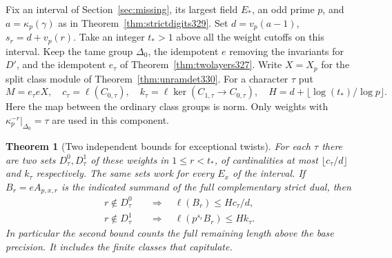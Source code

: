 \documentclass[a4paper,11pt]{article}
\newtheorem{theorem}[proposition]{Theorem}
\theoremstyle{definition}
\theoremstyle{remark}
\numberwithin{equation}{section}
\begin{document}
Fix an interval of Section~\ref{sec:missing}, its largest field $E_*$,
an odd prime $p$, and $a=\kappa_p(\gamma)$ as in
Theorem~\ref{thm:strictdigits329}. Set $d=v_p(a-1)$, $s_r=d+v_p(r)$.
Take an integer $t_*>1$ above all the weight cutoffs on this interval.
Keep the tame group $\Delta_0$, the idempotent $e$ removing the
invariants for $D'$, and the idempotent $e_\tau$ of
Theorem~\ref{thm:twolayers327}. Write $X=X_p$ for the split class
module of Theorem~\ref{thm:unramdet330}. For a character $\tau$ put
\[
 M=e_\tau eX,\quad c_\tau=\ell(C_{0,\tau}),\quad
 k_\tau=\ell\ker(C_{1,\tau}\longrightarrow C_{0,\tau}),\quad
 H=d+\lfloor\log(t_*)/\log p\rfloor .
\]
Here the map between the ordinary class groups is norm. Only weights
with $\kappa_p^{-r}|_{\Delta_0}=\tau$ are used in this component.

\begin{theorem}[Two independent bounds for exceptional twists]\leavevmode\label{thm:normsample340}
For each $\tau$ there are two sets $D^0_\tau,D^1_\tau$ of these weights
in $1\le r<t_*$, of cardinalities at most $\lfloor c_\tau/d\rfloor$
and $k_\tau$ respectively. The same sets work for every $E_x$ of the
interval. If $B_r=eA_{p,x,r}$ is the indicated summand of the full
complementary strict dual, then
\[
\begin{aligned}
 r\notin D^0_\tau &\quad\Longrightarrow\quad
        \ell(B_r)\le H c_\tau/d,\\
 r\notin D^1_\tau &\quad\Longrightarrow\quad
        \ell(p^{s_r}B_r)\le H k_\tau .
\end{aligned}
\]
In particular the second bound counts the full remaining length above
the base precision. It includes the finite classes that capitulate.
\end{theorem}
\end{document}
